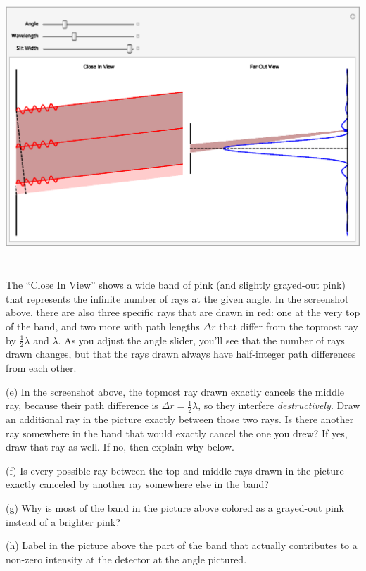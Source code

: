 {\centering \includegraphics[height=4.1in]{diffraction_of_light/one_slit_screengrab.eps} \par}

The ``Close In View'' shows a wide band of pink (and slightly grayed-out pink) that represents the infinite number of rays at the given angle.  In the screenshot above, there are also three specific rays that are drawn in red: one at the very top of the band, and two more with path lengths $\Delta r$ that differ from the topmost ray by $\frac{1}{2} \lambda$ and $\lambda$.  As you adjust the angle slider, you'll see that the number of rays drawn changes, but that the rays drawn always have half-integer path differences from each other. 

(e) In the screenshot above, the topmost ray drawn exactly cancels the middle ray, because their path difference is $\Delta r = \frac{1}{2} \lambda$, so they interfere \textit{destructively}.  Draw an additional ray in the picture exactly between those two rays.  Is there another ray somewhere in the band that would exactly cancel the one you drew?  If yes, draw that ray as well.  If no, then explain why below.
\answerspace{0.5in}

(f) Is every possible ray between the top and middle rays drawn in the picture exactly canceled by another ray somewhere else in the band?
\answerspace{0.4in}

(g) Why is most of the band in the picture above colored as a grayed-out pink instead of a brighter pink?
\answerspace{0.4in}

(h) Label in the picture above the part of the band that actually contributes to a non-zero intensity at the detector at the angle pictured.

